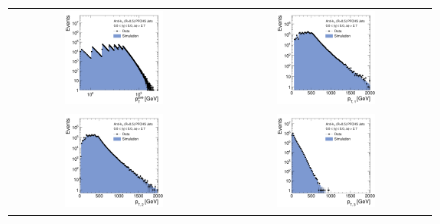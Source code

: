 \begin{figure}[!tp]
  \centering
  \begin{tabular}{cc}
                \includegraphics[width=0.49\textwidth]{figures/PtAve__AfterAsymmHistos.pdf} &
                \includegraphics[width=0.49\textwidth]{figures/Jet1Pt__AfterAsymmHistos.pdf} \\
                \includegraphics[width=0.49\textwidth]{figures/Jet2Pt__AfterAsymmHistos.pdf} &
                \includegraphics[width=0.49\textwidth]{figures/Jet3Pt__AfterAsymmHistos.pdf}


\end{tabular}
\end{figure}
